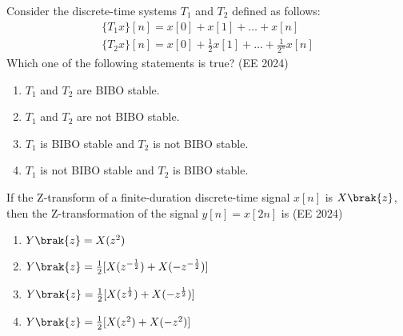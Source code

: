 \item Consider the discrete-time systems $T_1$ and $T_2$ defined as follows:
\begin{align}
\{T_1x\}[n] = x[0]+x[1]+\dots+x[n]\\
\{T_2x\}[n] = x[0]+\frac{1}{2}x[1]+\dots+\frac{1}{2^n}x[n]
\end{align}
Which one of the following statements is true?
\hfill{(EE 2024)}
\begin{enumerate}
\item $T_1$ and $T_2$ are BIBO stable.
\item $T_1$ and $T_2$ are not BIBO stable.
\item $T_1$ is BIBO stable and $T_2$ is not BIBO stable.
\item $T_1$ is not BIBO stable and $T_2$ is BIBO stable.
\end{enumerate}
\item If the Z-transform of a finite-duration discrete-time signal $x[n]$ is $X\brak{z}$, then the  Z-transformation of the signal $y[n]=x[2n]$ is
 \hfill{(EE 2024)}
\begin{enumerate}
\item $Y\brak{z}=X(z^{2})$
\item $Y\brak{z}=\frac{1}{2}[X(z^{-\frac{1}{2}})+X(-z^{-\frac{1}{2}})]$
\item $Y\brak{z}=\frac{1}{2}[X(z^{\frac{1}{2}})+X(-z^{\frac{1}{2}})]$
\item $Y\brak{z}=\frac{1}{2}[X(z^{2})+X(-z^{2})]$
\end{enumerate}

